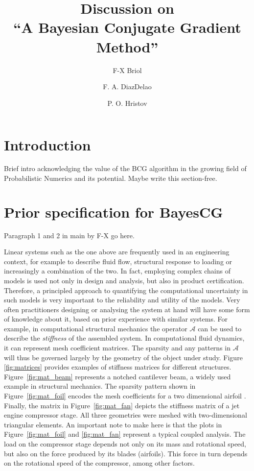 \documentclass{elsarticle}
\begin{document}
	\begin{frontmatter}
		\title{\textbf{Discussion on \\
		 ``A Bayesian Conjugate Gradient Method''}}
		
		\author{F-X Briol}
		
		\author{F. A. DiazDelao}
		
		\author{P. O. Hristov}
		
		\address{University College London \& The Alan Turing Institute}
		\address{Institute for Risk and Uncertainty, University of Liverpool}
		
		\journal{}
	\end{frontmatter}
	\section{Introduction}
		Brief intro acknowledging the value of the BCG algorithm in the growing field of Probabilistic Numerics and its potential. Maybe write this section-free.
	\section{Prior specification for BayesCG}
		Paragraph 1 and 2 in main by F-X go here.
		
		Linear systems such as the one above are frequently used in an engineering context, for example to describe fluid flow, structural response to loading or increasingly a combination of the two. In fact, employing complex chains of models is used not only in design and analysis, but also in product certification. Therefore, a principled approach to quantifying the computational uncertainty in such models is very important to the reliability and utility of the models.
		Very often practitioners designing or analysing the system at hand will have some form of knowledge about it, based on prior experience with similar systems. For example, in computational structural mechanics the operator $\mathcal{A}$ can be used to describe the \textit{stiffness} of the assembled system. In computational fluid dynamics, it can represent mesh coefficient matrices. The sparsity and any patterns in $\mathcal{A}$ will thus be governed largely by the geometry of the object under study. Figure \ref{fig:matrices} provides examples of stiffness matrices for different structures. Figure~\ref{fig:mat_beam} represents a notched cantilever beam, a widely used example in structural mechanics. The sparsity pattern shown in Figure~\ref{fig:mat_foil} encodes the mesh coefficients for a two dimensional airfoil \cite{Davis:2011}. Finally, the matrix in Figure~\ref{fig:mat_fan} depicts the stiffness matrix of a jet engine compressor stage. All three geometries were meshed with two-dimensional triangular elements. An important note to make here is that the plots in Figure~\ref{fig:mat_foil} and \ref{fig:mat_fan} represent a typical coupled analysis. The load on the compressor stage depends not only on its mass and rotational speed, but also on the force produced by its blades (airfoils). This force in turn depends on the rotational speed of the compressor, among other factors.
		
\end{document}
